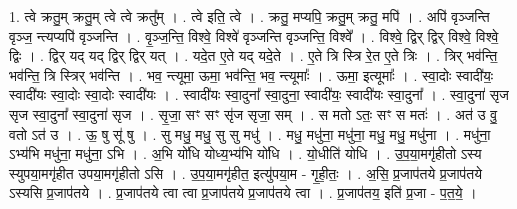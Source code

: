\documentclass[17pt]{extarticle}
\begin{document}
1. त्वे क्रतु॒म् क्रतु॒म् त्वे त्वे क्रतु᳚म् । . त्वे इति॒ त्वे । . क्रतु॒ मप्यपि॒ क्रतु॒म् क्रतु॒ मपि॑ । . अपि॑ वृञ्जन्ति वृञ्ज॒ न्त्यप्यपि॑ वृञ्जन्ति । . वृ॒ञ्ज॒न्ति॒ विश्वे॒ विश्वे॑ वृञ्जन्ति वृञ्जन्ति॒ विश्वे᳚ । . विश्वे॒ द्विर् द्विर् विश्वे॒ विश्वे॒ द्विः । . द्विर् यद् यद् द्विर् द्विर् यत् । . यदे॒त ए॒ते यद् यदे॒ते । . ए॒ते त्रि स्त्रि रे॒त ए॒ते त्रिः । . त्रिर् भव॑न्ति॒ भव॑न्ति॒ त्रि स्त्रिर् भव॑न्ति । . भव॒ न्त्यूमा॒ ऊमा॒ भव॑न्ति॒ भव॒ न्त्यूमाः᳚ । . ऊमा॒ इत्यूमाः᳚ । . स्वा॒दोः स्वादी॑यः॒ स्वादी॑यः स्वा॒दोः स्वा॒दोः स्वादी॑यः । . स्वादी॑यः स्वा॒दुना᳚ स्वा॒दुना॒ स्वादी॑यः॒ स्वादी॑यः स्वा॒दुना᳚ । . स्वा॒दुना॑ सृज सृज स्वा॒दुना᳚ स्वा॒दुना॑ सृज । . सृ॒जा॒ सꣳ सꣳ सृ॑ज सृजा॒ सम् । . स मतो ऽतः॒ सꣳ स मतः॑ । . अत॑ उ वु॒ वतो ऽत॑ उ । . ऊ॒ षु सू॑ षु । . सु मधु॒ मधु॒ सु सु मधु॑ । . मधु॒ मधु॑ना॒ मधु॑ना॒ मधु॒ मधु॒ मधु॑ना । . मधु॑ना॒ ऽभ्य॑भि मधु॑ना॒ मधु॑ना॒ ऽभि । . अ॒भि यो॑धि योध्य॒भ्य॑भि यो॑धि । . यो॒धीति॑ योधि । . उ॒प॒या॒मगृ॑हीतो ऽस्य स्युपया॒मगृ॑हीत उपया॒मगृ॑हीतो ऽसि । . उ॒प॒या॒मगृ॑हीत॒ इत्यु॑पया॒म - गृ॒ही॒तः॒ । . अ॒सि॒ प्र॒जाप॑तये प्र॒जाप॑तये ऽस्यसि प्र॒जाप॑तये । . प्र॒जाप॑तये त्वा त्वा प्र॒जाप॑तये प्र॒जाप॑तये त्वा । . प्र॒जाप॑तय॒ इति॑ प्र॒जा - प॒त॒ये॒ । \newline
\end{document}
